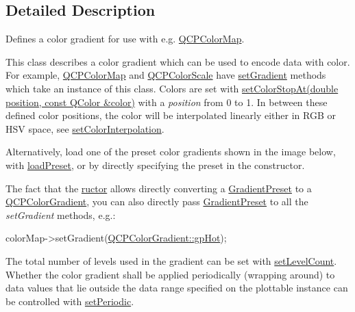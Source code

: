 \subsection{Detailed Description}
Defines a color gradient for use with e.\+g. \hyperlink{class_q_c_p_color_map}{Q\+C\+P\+Color\+Map}. 

This class describes a color gradient which can be used to encode data with color. For example, \hyperlink{class_q_c_p_color_map}{Q\+C\+P\+Color\+Map} and \hyperlink{class_q_c_p_color_scale}{Q\+C\+P\+Color\+Scale} have \hyperlink{class_q_c_p_color_map_a7313c78360471cead3576341a2c50377}{set\+Gradient} methods which take an instance of this class. Colors are set with \hyperlink{class_q_c_p_color_gradient_a3b48be5e78079db1bb2a1188a4c3390e}{set\+Color\+Stop\+At(double position, const Q\+Color \&color)} with a {\itshape position} from 0 to 1. In between these defined color positions, the color will be interpolated linearly either in R\+G\+B or H\+S\+V space, see \hyperlink{class_q_c_p_color_gradient_aa13fda86406e1d896a465a409ae63b38}{set\+Color\+Interpolation}.

Alternatively, load one of the preset color gradients shown in the image below, with \hyperlink{class_q_c_p_color_gradient_aa0aeec1528241728b9671bf8e60b1622}{load\+Preset}, or by directly specifying the preset in the constructor.



The fact that the \hyperlink{class_q_c_p_color_gradient}{ructor} allows directly converting a \hyperlink{class_q_c_p_color_gradient_aed6569828fee337023670272910c9072}{Gradient\+Preset} to a \hyperlink{class_q_c_p_color_gradient}{Q\+C\+P\+Color\+Gradient}, you can also directly pass \hyperlink{class_q_c_p_color_gradient_aed6569828fee337023670272910c9072}{Gradient\+Preset} to all the {\itshape set\+Gradient} methods, e.\+g.\+: 
\begin{DoxyCode}
colorMap->setGradient(\hyperlink{class_q_c_p_color_gradient_aed6569828fee337023670272910c9072a4f42e534cf6cff5a29a5388094d099b5}{QCPColorGradient::gpHot});
\end{DoxyCode}


The total number of levels used in the gradient can be set with \hyperlink{class_q_c_p_color_gradient_a18da587eb4f7fc788ea28ba15b6a12de}{set\+Level\+Count}. Whether the color gradient shall be applied periodically (wrapping around) to data values that lie outside the data range specified on the plottable instance can be controlled with \hyperlink{class_q_c_p_color_gradient_a39d6448155fc00a219f239220d14bb39}{set\+Periodic}. 

